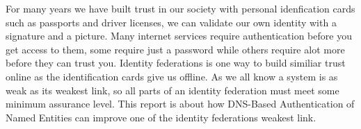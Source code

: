 For many years we have built trust in our society with personal idenfication cards such as passports and driver licenses, we can validate our own identity with a signature and a picture.
Many internet services require authentication before you get access to them, some require just a password while others require alot more before they can trust you.
Identity federations is one way to build similiar trust online as the identification cards give us offline.
As we all know a system is as weak as its weakest link, so all parts of an identity federation must meet some minimum assurance level.
This report is about how DNS-Based Authentication of Named Entities can improve one of the identity federations weakest link.





